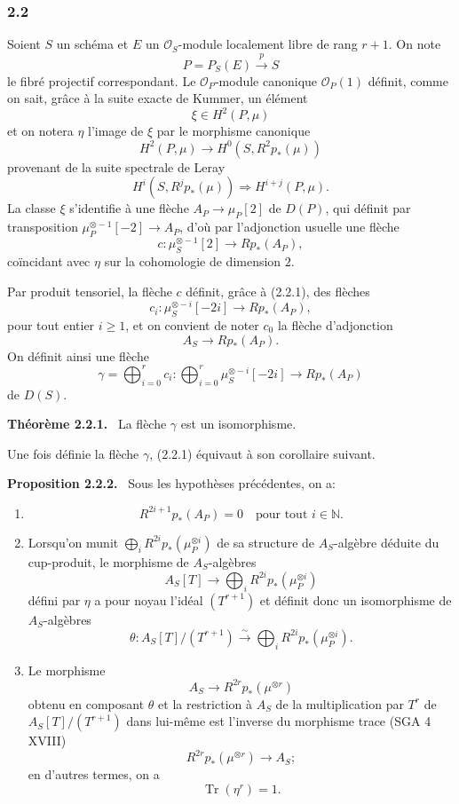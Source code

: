 \documentclass[11pt]{article}
\newenvironment{statement}[1]{\par\medskip\noindent\textbf{#1.}\ }{\par\medskip}
\begin{document}
\subsubsection*{2.2}
Soient $S$ un schéma et $E$ un $\mathcal O_S$-module localement libre de rang $r+1$. On note
\[
P=P_S(E)\xrightarrow{p}S
\]
le fibré projectif correspondant. Le $\mathcal O_P$-module canonique $\mathcal O_P(1)$ définit, comme on sait, grâce à la suite exacte de Kummer, un élément
\[
\xi\in H^2(P,\mu)
\]
et on notera $\eta$ l'image de $\xi$ par le morphisme canonique
\[
H^2(P,\mu)\longrightarrow H^0(S,R^2p_*(\mu))
\]
provenant de la suite spectrale de Leray
\[
H^i(S,R^jp_*(\mu))\Rightarrow H^{i+j}(P,\mu).
\]
La classe $\xi$ s'identifie à une flèche $A_P\to\mu_P[2]$ de $D(P)$, qui définit par transposition $\mu_P^{\otimes -1}[-2]\to A_P$, d'où par l'adjonction usuelle une flèche
\[
c:\mu_S^{\otimes -1}[2]\longrightarrow Rp_*(A_P),
\]
coïncidant avec $\eta$ sur la cohomologie de dimension $2$.

Par produit tensoriel, la flèche $c$ définit, grâce à (2.2.1), des flèches
\[
c_i:\mu_S^{\otimes -i}[-2i]\longrightarrow Rp_*(A_P),
\]
pour tout entier $i\ge1$, et on convient de noter $c_0$ la flèche d'adjonction
\[
A_S\longrightarrow Rp_*(A_P).
\]
On définit ainsi une flèche
\[
\gamma=\bigoplus_{i=0}^{r}c_i:
\bigoplus_{i=0}^{r}\mu_S^{\otimes -i}[-2i]\longrightarrow Rp_*(A_P)
\]
de $D(S)$.

\begin{statement}{Théorème 2.2.1}
La flèche $\gamma$ est un isomorphisme.
\end{statement}

Une fois définie la flèche $\gamma$, (2.2.1) équivaut à son corollaire suivant.

\begin{statement}{Proposition 2.2.2}
Sous les hypothèses précédentes, on a:
\begin{enumerate}[label=\alph*)]
\item
\[
R^{2i+1}p_*(A_P)=0\quad\text{pour tout }i\in\mathbb N.
\]
\item Lorsqu'on munit $\bigoplus_i R^{2i}p_*(\mu_P^{\otimes i})$ de sa structure de $A_S$-algèbre déduite du cup-produit, le morphisme de $A_S$-algèbres
\[
A_S[T]\longrightarrow \bigoplus_i R^{2i}p_*(\mu_P^{\otimes i})
\]
défini par $\eta$ a pour noyau l'idéal $(T^{r+1})$ et définit donc un isomorphisme de $A_S$-algèbres
\[
\theta:A_S[T]/(T^{r+1})\xrightarrow{\sim}\bigoplus_i R^{2i}p_*(\mu_P^{\otimes i}).
\]
\item Le morphisme
\[
A_S\longrightarrow R^{2r}p_*(\mu^{\otimes r})
\]
obtenu en composant $\theta$ et la restriction à $A_S$ de la multiplication par $T^r$ de $A_S[T]/(T^{r+1})$ dans lui-même est l'inverse du morphisme trace (SGA 4 XVIII)
\[
R^{2r}p_*(\mu^{\otimes r})\longrightarrow A_S;
\]
en d'autres termes, on a
\[
\operatorname{Tr}(\eta^r)=1.
\]
\end{enumerate}
\end{statement}
\end{document}
